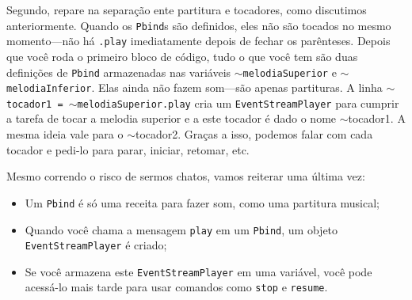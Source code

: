 Segundo, repare na separação ente partitura e tocadores, como discutimos anteriormente. Quando os \texttt{Pbind}s são definidos, eles não são tocados no mesmo momento---não há \texttt{.play} imediatamente depois de fechar os parênteses. Depois que você roda o primeiro bloco de código, tudo o que você tem são duas definições de \texttt{Pbind} armazenadas nas variáveis \texttt{$\sim$melodiaSuperior} e \texttt{$\sim$melodiaInferior}. Elas ainda não fazem som---são apenas partituras. A linha \texttt{$\sim$tocador1 = $\sim$melodiaSuperior.play} cria um \texttt{EventStreamPlayer} para cumprir a tarefa de tocar a melodia superior e a este tocador é dado o nome $\sim$tocador1. A mesma ideia vale para o $\sim$tocador2. Graças a isso, podemos falar com cada tocador e pedi-lo para parar, iniciar, retomar, etc.

Mesmo correndo o risco de sermos chatos, vamos reiterar uma última vez:
\begin{itemize}
\item Um \texttt{Pbind} é só uma receita para fazer som, como uma partitura musical;
\item Quando você chama a mensagem \texttt{play} em um \texttt{Pbind}, um objeto \texttt{EventStreamPlayer} é criado;
\item Se você armazena este \texttt{EventStreamPlayer} em uma variável, você pode acessá-lo mais tarde para usar comandos como \texttt{stop} e \texttt{resume}.
\end{itemize} 
